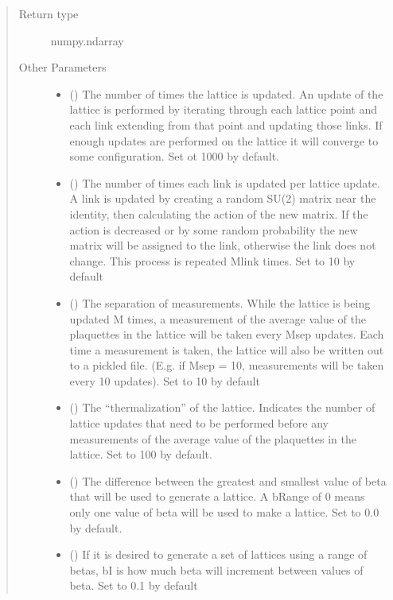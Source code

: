 \documentclass[letterpaper,10pt,english]{sphinxmanual}
\begin{document}
\begin{fulllineitems}
\begin{quote}
\begin{description}
\item[{Return type}] \leavevmode
numpy.ndarray

\item[{Other Parameters}] \leavevmode\begin{itemize}
\item {} 
 () \textendash{} The number of times the lattice is updated. An update of the
lattice is performed by iterating through each lattice point
and each link extending from that point and updating those
links. If enough updates are performed on the lattice it  will
converge to some configuration. Set ot 1000 by default.

\item {} 
 () \textendash{} The number of times each link is updated per lattice update. A
link is updated by creating a random SU(2) matrix near the
identity, then calculating the action of the new matrix. If the
action is decreased or by some random probability the new
matrix will be assigned to the link, otherwise the link does
not change. This process is repeated Mlink times. Set to 10 by
default

\item {} 
 () \textendash{} The separation of measurements. While the lattice is being
updated M times, a measurement of the average value of the
plaquettes in the lattice will be taken every Msep updates.
Each time a measurement is taken, the lattice will also be
written out to a pickled file.
(E.g. if Msep = 10, measurements will be taken every 10
updates). Set to 10 by default

\item {} 
 () \textendash{} The “thermalization” of the lattice. Indicates the number of
lattice updates that need to be performed before any
measurements of the average value of the plaquettes in the
lattice. Set to 100 by default.

\item {} 
 () \textendash{} The difference between the greatest and smallest value of beta
that will be used to generate a lattice. A bRange of 0 means
only one value of beta will be used to make a lattice. Set to
0.0 by default.

\item {} 
 () \textendash{} If it is desired to generate a set of lattices using a range of
betas, bI is how much beta will increment between values of
beta. Set to 0.1 by default


\end{itemize}
\end{description}
\end{quote}
\end{fulllineitems}
\end{document}

